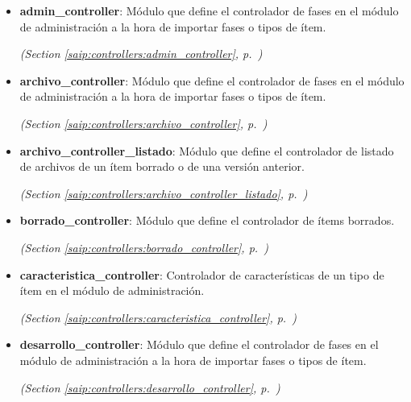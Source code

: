 \begin{itemize}
\setlength{\parskip}{0ex}
\item \textbf{admin\_controller}: Módulo que define el controlador de fases en el módulo de administración a 
la hora de importar fases o tipos de ítem.



  \textit{(Section \ref{saip:controllers:admin_controller}, p.~\pageref{saip:controllers:admin_controller})}

\item \textbf{archivo\_controller}: Módulo que define el controlador de fases en el módulo de administración a 
la hora de importar fases o tipos de ítem.



  \textit{(Section \ref{saip:controllers:archivo_controller}, p.~\pageref{saip:controllers:archivo_controller})}

\item \textbf{archivo\_controller\_listado}: Módulo que define el controlador de listado de archivos de un ítem borrado 
o de una versión anterior.



  \textit{(Section \ref{saip:controllers:archivo_controller_listado}, p.~\pageref{saip:controllers:archivo_controller_listado})}

\item \textbf{borrado\_controller}: Módulo que define el controlador de ítems borrados.



  \textit{(Section \ref{saip:controllers:borrado_controller}, p.~\pageref{saip:controllers:borrado_controller})}

\item \textbf{caracteristica\_controller}: Controlador de características de un tipo de ítem en el módulo de 
administración.



  \textit{(Section \ref{saip:controllers:caracteristica_controller}, p.~\pageref{saip:controllers:caracteristica_controller})}

\item \textbf{desarrollo\_controller}: Módulo que define el controlador de fases en el módulo de administración a 
la hora de importar fases o tipos de ítem.



  \textit{(Section \ref{saip:controllers:desarrollo_controller}, p.~\pageref{saip:controllers:desarrollo_controller})}


\end{itemize}
